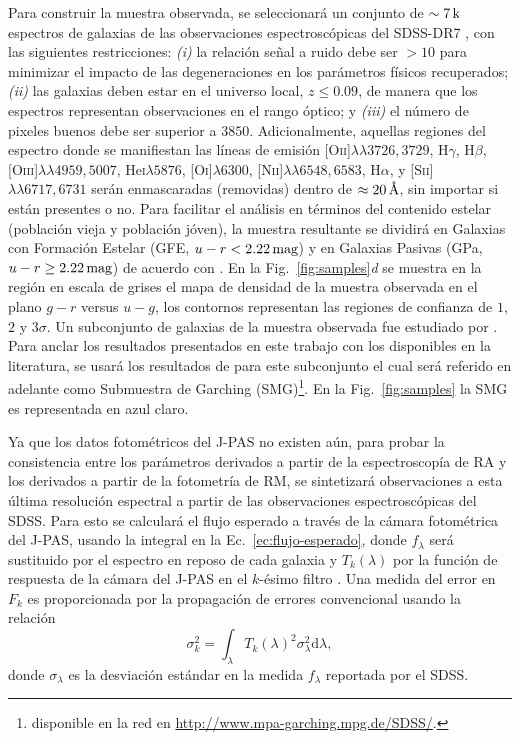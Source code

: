 Para construir la muestra observada, se seleccionará un conjunto de $\sim\unit[7]{k}$ espectros de
galaxias de las observaciones espectroscópicas del SDSS-DR7 \citep{Abazajian2009}, con las
siguientes restricciones: \textit{(i)} la relación señal a ruido debe ser $>10$ para minimizar el
impacto de las degeneraciones en los parámetros físicos recuperados; \textit{(ii)} las galaxias
deben estar en el universo local, $z\leq0.09$, de manera que los espectros representan observaciones
en el rango óptico; y \textit{(iii)} el número de pixeles buenos debe ser superior a $3850$.
Adicionalmente, aquellas regiones del espectro donde se manifiestan las líneas de emisión
[O\textsc{ii}]$\lambda\lambda3726,3729$, H$\gamma$, H$\beta$,
[O\textsc{iii}]$\lambda\lambda4959,5007$, He\textsc{i}$\lambda5876$, [O\textsc{i}]$\lambda6300$,
[N\textsc{ii}]$\lambda\lambda6548,6583$, H$\alpha$, y [S\textsc{ii}]$\lambda\lambda6717,6731$ serán
enmascaradas (removidas) dentro de $\approx\unit[20]{\AA}$, sin importar si están presentes o no.
Para facilitar el análisis en términos del contenido estelar (población vieja y población jóven), la
muestra resultante se dividirá en Galaxias con Formación Estelar (GFE, $u-r<\unit[2.22]{mag}$) y en
Galaxias Pasivas (GPa, $u-r\geq\unit[2.22]{mag}$) de acuerdo con \citet{Strateva2001}. En la
Fig.~\ref{fig:samples}\textit{d} se muestra en la región en escala de grises el mapa de densidad de
la muestra observada en el plano $g-r$ versus $u-g$, los contornos representan las regiones de
confianza de $1$, $2$ y $3\sigma$. Un subconjunto de galaxias de la muestra observada
fue estudiado por \citet{Gallazzi2005}. Para anclar los resultados presentados en este trabajo con
los disponibles en la literatura, se usará los resultados de \citet{Gallazzi2005} para este
subconjunto el cual será referido en adelante como Submuestra de Garching (SMG)\footnote{disponible
en la red en \url{http://www.mpa-garching.mpg.de/SDSS/}.}. En la Fig.~\ref{fig:samples} la SMG es
representada en azul claro.

Ya que los datos fotométricos del J-PAS no existen aún, para probar la consistencia entre los
parámetros derivados a partir de la espectroscopía de RA y los derivados a partir de la fotometría
de RM, se sintetizará observaciones a esta última resolución espectral a partir de las observaciones
espectroscópicas del SDSS. Para esto se calculará el flujo esperado a través de la cámara
fotométrica del J-PAS,  usando la integral en la Ec.~\eqref{ec:flujo-esperado}, donde $f_\lambda$
será sustituido por el espectro en reposo de cada galaxia y $T_k(\lambda)$ por la función de
respuesta de la cámara del J-PAS en el $k$-ésimo filtro \citep{Marin-Franch2015}. Una medida del
error en $F_k$ es proporcionada por la propagación de errores convencional
\citep[\eg,][]{Bevington2003} usando la relación
%
\begin{equation}\label{ec:error-prop}
\sigma_k^2 = \int_\lambda T_k(\lambda)^2\sigma_\lambda^2\text{d}\lambda,
\end{equation}
%
donde $\sigma_\lambda$ es la desviación estándar en la medida $f_\lambda$ reportada por el
SDSS.


